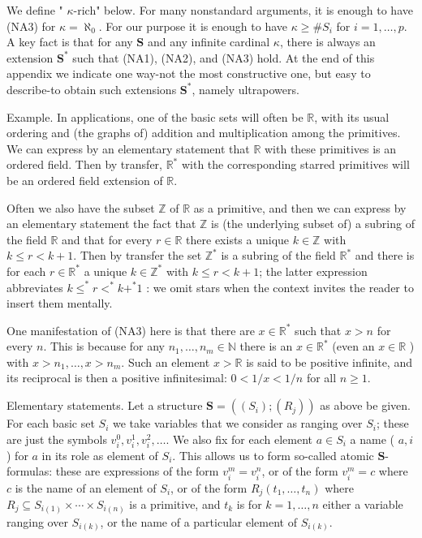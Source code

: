 \documentclass[10pt]{article}
\begin{document}
We define " $\kappa$-rich" below. For many nonstandard arguments, it is enough to have (NA3) for $\kappa=\boldsymbol{\aleph}_{0}$. For our purpose it is enough to have $\kappa \geq \# S_{i}$ for $i=1, \ldots, p$. A key fact is that for any $\mathbf{S}$ and any infinite cardinal $\kappa$, there is always an extension $\mathbf{S}^{*}$ such that (NA1), (NA2), and (NA3) hold. At the end of this appendix we indicate one way-not the most constructive one, but easy to describe-to obtain such extensions $\mathbf{S}^{*}$, namely ultrapowers.

Example. In applications, one of the basic sets will often be $\mathbb{R}$, with its usual ordering and (the graphs of) addition and multiplication among the primitives. We can express by an elementary statement that $\mathbb{R}$ with these primitives is an ordered field. Then by transfer, $\mathbb{R}^{*}$ with the corresponding starred primitives will be an ordered field extension of $\mathbb{R}$.

Often we also have the subset $\mathbb{Z}$ of $\mathbb{R}$ as a primitive, and then we can express by an elementary statement the fact that $\mathbb{Z}$ is (the underlying subset of) a subring of the field $\mathbb{R}$ and that for every $r \in \mathbb{R}$ there exists a unique $k \in \mathbb{Z}$ with $k \leq r<k+1$. Then by transfer the set $\mathbb{Z}^{*}$ is a subring of the field $\mathbb{R}^{*}$ and there is for each $r \in \mathbb{R}^{*}$ a unique $k \in \mathbb{Z}^{*}$ with $k \leq r<k+1$; the latter expression abbreviates $k \leq^{*} r<^{*} k+^{*} 1$ : we omit stars when the context invites the reader to insert them mentally.

One manifestation of (NA3) here is that there are $x \in \mathbb{R}^{*}$ such that $x>n$ for every $n$. This is because for any $n_{1}, \ldots, n_{m} \in \mathbb{N}$ there is an $x \in \mathbb{R}^{*}$ (even an $x \in \mathbb{R}$ ) with $x>n_{1}, \ldots, x>n_{m}$. Such an element $x>\mathbb{R}$ is said to be positive infinite, and its reciprocal is then a positive infinitesimal: $0<1 / x<1 / n$ for all $n \geq 1$.

Elementary statements. Let a structure $\mathbf{S}=\left(\left(S_{i}\right) ;\left(R_{j}\right)\right)$ as above be given. For each basic set $S_{i}$ we take variables that we consider as ranging over $S_{i}$; these are just the symbols $v_{i}^{0}, v_{i}^{1}, v_{i}^{2}, \ldots$. We also fix for each element $a \in S_{i}$ a name ( $a, i$ ) for $a$ in its role as element of $S_{i}$. This allows us to form so-called atomic $\mathbf{S}$-formulas: these are expressions of the form $v_{i}^{m}=v_{i}^{n}$, or of the form $v_{i}^{m}=c$ where $c$ is the name of an element of $S_{i}$, or of the form $R_{j}\left(t_{1}, \ldots, t_{n}\right)$ where $R_{j} \subseteq S_{i(1)} \times \cdots \times S_{i(n)}$ is a primitive, and $t_{k}$ is for $k=1, \ldots, n$ either a variable ranging over $S_{i(k)}$, or the name of a particular element of $S_{i(k)}$.
\end{document}
